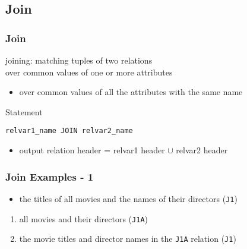 \documentclass[dvipsnames]{beamer}
\theoremstyle{plain}
\begin{document}
\subsection{Join}

\begin{frame}[fragile]
  \frametitle{Join}

  \begin{definition}
    \alert{joining}: matching tuples of two relations\\
      over common values of one or more attributes

    \begin{itemize}
      \item over common values of all the attributes with the same name
    \end{itemize}
  \end{definition}

  \pause
  \begin{block}{Statement}
    \begin{lstlisting}
relvar1_name JOIN relvar2_name
    \end{lstlisting}
  \end{block}

  \pause
  \begin{itemize}
    \item output relation header = relvar1 header $\cup$ relvar2 header
  \end{itemize}
\end{frame}

\begin{frame}
  \frametitle{Join Examples - 1}

  \begin{example}
    \begin{itemize}
      \item the titles of all movies and the names of their directors
        (\texttt{J1})
    \end{itemize}

    \pause
    \begin{enumerate}
      \item all movies and their directors (\texttt{J1A})

      \pause
      \item the movie titles and director names in the \texttt{J1A} relation
        (\texttt{J1})
    \end{enumerate}
  \end{example}
\end{frame}
\end{document}
